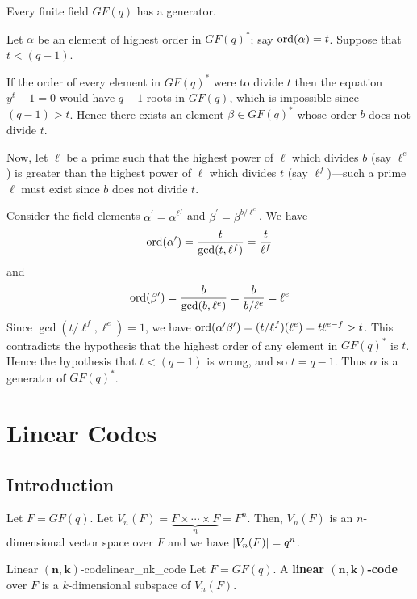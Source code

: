\begin{Theorem}{}{}
    Every finite field $ GF(q) $ has a generator.
\end{Theorem}

\begin{Proof}{}{}
    Let $ \alpha $ be an element of highest order in $ GF(q)^* $;
    say $ \operatorname{ord}(\alpha)=t $. Suppose that $ t<(q-1) $.

    If the order of every element in $ GF(q)^* $ were to divide $ t $ then the equation
    $ y^t-1=0 $ would have $ q-1 $ roots in $ GF(q) $, which is impossible
    since $ (q-1)>t $. Hence there exists an element $ \beta\in GF(q)^* $
    whose order $ b $ does not divide $ t $.

    Now, let $ \ell $ be a prime such that the highest power of $ \ell $
    which divides $ b $ (say $ \ell^e $) is greater than the highest
    power of $ \ell $ which divides $ t $ (say $ \ell^f $)---such a prime
    $ \ell $ must exist since $ b $ does not divide $ t $.

    Consider the field elements $ \alpha^{\prime}=\alpha^{\ell^f} $
    and $ \beta^{\prime}=\beta^{b/\ell^e} $. We have
    \[ \operatorname{ord}(\alpha^{\prime})=\frac{t}{\gcd(t,\ell^f)} =\frac{t}{\ell^f} \]
    and
    \[ \operatorname{ord}(\beta^{\prime})=\frac{b}{\gcd(b,\ell^e)} =\frac{b}{b/\ell^e}=\ell^e \]
    Since $ \gcd(t/\ell^f,\ell^e)=1 $, we have $ \operatorname{ord}(\alpha^{\prime}\beta^{\prime})=
        (t/\ell^f)(\ell^e)=t\ell^{e-f}>t $. This contradicts the hypothesis
    that the highest order of any element in $ GF(q)^* $ is $ t $. Hence the
    hypothesis that $ t<(q-1) $ is wrong, and so $ t=q-1 $. Thus $ \alpha $
    is a generator of $ GF(q)^* $.
\end{Proof}

\chapter{Linear Codes}
\section{Introduction}
Let $ F=GF(q) $. Let $ V_n(F)=\underbrace{F\times\cdots\times F}_{n}=F^n $.
Then, $ V_n(F) $ is an $ n $-dimensional vector space over $ F $ and
we have $ \lvert V_n(F)\rvert=q^n $.

\begin{Definition}{Linear $ \symbf{(n,k)} $-code}{linear_nk_code}
    Let $ F=GF(q) $.
    A \textbf{linear $ \symbf{(n,k)} $-code} over $ F $ is a $ k $-dimensional subspace
    of $ V_n(F) $.
\end{Definition}

